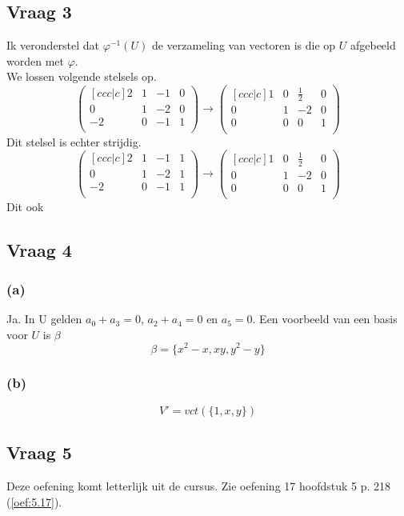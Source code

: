 \documentclass[lineaire_algebra_oplossingen.tex]{subfiles}
\begin{document}
\subsection{Vraag 3}
Ik veronderstel dat $\varphi^{-1}(U)$ de verzameling van vectoren is die op $U$ afgebeeld worden met $\varphi$.\\
We lossen volgende stelsels op.
\[
\begin{pmatrix}[c c c | c]
2 & 1 & -1 & 0\\
0 & 1 & -2 & 0\\
-2 & 0 &-1 & 1\\
\end{pmatrix}
\rightarrow
\begin{pmatrix}[c c c | c]
1 & 0 & \frac{1}{2} & 0\\
0 & 1 & -2 & 0\\
0 & 0 & 0 & 1\\
\end{pmatrix}
\]
Dit stelsel is echter strijdig. %
\[
\begin{pmatrix}[c c c | c]
2 & 1 & -1 & 1\\
0 & 1 & -2 & 1\\
-2 & 0 &-1 & 1\\
\end{pmatrix}
\rightarrow
\begin{pmatrix}[c c c | c]
1 & 0 & \frac{1}{2} & 0\\
0 & 1 & -2 & 0\\
0 & 0 & 0 & 1\\
\end{pmatrix}
\]
Dit ook %


\subsection{Vraag 4}
\subsubsection*{(a)}
Ja. In U gelden $a_0+a_3=0$, $a_2+a_4=0$ en $a_5=0$.
Een voorbeeld van een basis voor $U$ is $\beta$
\[
\beta = \{x^2-x,xy,y^2-y\}
\]

\subsubsection*{(b)}
\[
V' = vct(\{1,x,y\})
\]

\subsection{Vraag 5}
Deze oefening komt letterlijk uit de cursus. Zie oefening 17 hoofdstuk 5 p. 218 (\ref{oef:5.17}).
\end{document}
